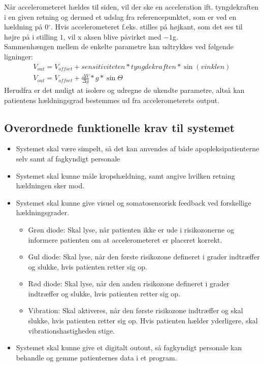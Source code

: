 Når accelerometeret hældes til siden, vil der ske en acceleration ift. tyngdekraften i en given retning og dermed et udslag fra referencepunktet, som er ved en hældning på 0$^{\circ}$. Hvis accelerometeret f.eks. stilles på højkant, som det ses til højre på  i stilling $1$, vil x aksen blive påvirket med $-1$g.\cite{Devices2009} \\
Sammenhængen mellem de enkelte parametre kan udtrykkes ved følgende ligninger: 
\begin{align}
	V_{out} = V_{offset} + sensitiviteten * tyngdekraften * \sin(vinklen) \\
	V_{out} = V_{offset} + \frac{\Delta V}{\Delta g} * g * \sin \Theta
\end{align}
Herudfra er det muligt at isolere og udregne de ukendte parametre, altså kan patientens hældningsgrad bestemmes ud fra accelerometerets output.

\subsection{Overordnede funktionelle krav til systemet}\label{FunkKrav}
\begin{itemize}
	\item Systemet skal være simpelt, så det kan anvendes af både apopleksipatienterne selv samt af fagkyndigt personale
	\item Systemet skal kunne måle kropshældning, samt angive hvilken retning hældningen sker mod. 
	\item Systemet skal kunne give visuel og somatosensorisk feedback ved forskellige hældningsgrader.
	\begin{itemize}
		\item Grøn diode: Skal lyse, når patienten ikke er ude i risikozonerne og informere patienten om at accelerometeret er placeret korrekt.  
		\item Gul diode: Skal lyse, når den første risikozone defineret i grader indtræffer og slukke, hvis patienten retter sig op.
		\item Rød diode: Skal lyse, når den anden risikozone defineret i grader indtræffer og slukke, hvis patienten retter sig op.
		\item Vibration: Skal aktiveres, når den første risikozone indtræffer og skal slukke, hvis patienten retter sig op. Hvis patienten hælder yderligere, skal vibrationshastigheden stige.
	\end{itemize}
	\item Systemet skal kunne give et digitalt outout, så fagkyndigt personale kan behandle og gemme patienternes data i et program.
\end{itemize}


